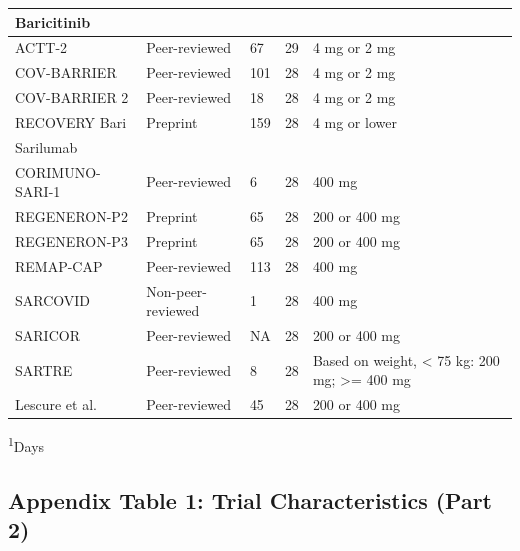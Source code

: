 \documentclass[
  12pt,
]{article}
\begin{document}
\begin{landscape}
\begin{longtable}{lllll}
\midrule
\multicolumn{1}{l}{Baricitinib} \\ 
\midrule
ACTT-2 & Peer-reviewed & 67 & 29 & 4 mg or 2 mg \\ 
COV-BARRIER & Peer-reviewed & 101 & 28 & 4 mg or 2 mg \\ 
COV-BARRIER 2 & Peer-reviewed & 18 & 28 & 4 mg or 2 mg \\ 
RECOVERY Bari & Preprint & 159 & 28 & 4 mg or lower \\ 
\midrule
\multicolumn{1}{l}{Sarilumab} \\ 
\midrule
CORIMUNO-SARI-1 & Peer-reviewed & 6 & 28 & 400 mg \\ 
REGENERON-P2 & Preprint & 65 & 28 & 200 or 400 mg \\ 
REGENERON-P3 & Preprint & 65 & 28 & 200 or 400 mg \\ 
REMAP-CAP & Peer-reviewed & 113 & 28 & 400 mg \\ 
SARCOVID & Non-peer-reviewed & 1 & 28 & 400 mg \\ 
SARICOR & Peer-reviewed & NA & 28 & 200 or 400 mg \\ 
SARTRE & Peer-reviewed & 8 & 28 & Based on weight, < 75 kg: 200 mg; >= 400 mg \\ 
Lescure et al. & Peer-reviewed & 45 & 28 & 200 or 400 mg \\ 
 \bottomrule
\end{longtable}
\vspace{-5mm}
\begin{minipage}{\linewidth}
\textsuperscript{1}Days \\ 
\end{minipage}

\newpage

\hypertarget{appendix-table-1-trial-characteristics-part-2}{%
\subsection{Appendix Table 1: Trial Characteristics (Part
2)}\label{appendix-table-1-trial-characteristics-part-2}}


\end{landscape}
\end{document}
